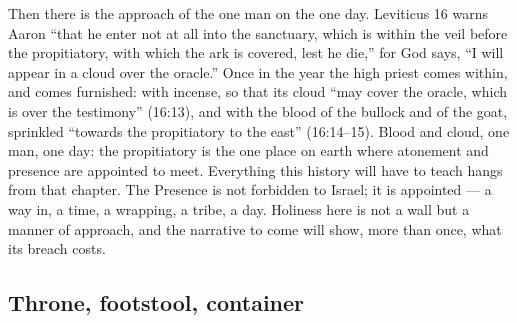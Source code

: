 Then there is the approach of the one man on the one day. Leviticus 16
warns Aaron ``that he enter not at all into the sanctuary, which is within
the veil before the propitiatory, with which the ark is covered, lest he
die,'' for God says, ``I will appear in a cloud over the oracle.'' Once in
the year the high priest comes within, and comes furnished: with incense,
so that its cloud ``may cover the oracle, which is over the testimony''
(16:13), and with the blood of the bullock and of the goat, sprinkled
``towards the propitiatory to the east''
(16:14--15). Blood and cloud, one man, one
day: the propitiatory is the one place on earth where atonement and
presence are appointed to meet. Everything this history will have to teach
hangs from that chapter. The Presence is not forbidden to Israel; it is
appointed ---
a way in, a time, a wrapping, a tribe, a day. Holiness here is not a wall
but a manner of approach, and the narrative to come will show, more than
once, what its breach costs.



\subsection{Throne, footstool, container}

